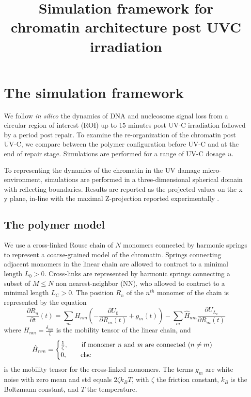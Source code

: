 \documentclass[12pt]{article}
\begin{document}
	
	\title{Simulation framework for chromatin architecture post UVC irradiation}
\maketitle
\section{The simulation framework}
	We follow \textit{in silico} the dynamics of DNA and nucleosome signal loss from a circular region of interest (ROI) up to 15 minutes post UV-C irradiation followed by a period post repair. To examine the re-organization of the chromatin post UV-C, we compare between the polymer configuration before UV-C and at the end of repair stage. Simulations are performed for a range of UV-C dosage $u$.  
	
	To representing the dynamics of the chromatin in the UV damage micro-environment, simulations are performed in a three-dimensional spherical domain with reflecting boundaries. Results are reported as the projected values on the x-y plane, in-line with the maximal Z-projection reported experimentally \cite{adam2015imaging}. 
	
	\subsection{The polymer model}
	We use a cross-linked Rouse chain of $N$ monomers connected by harmonic springs \cite{doi1988theory} to represent a coarse-grained model of the chromatin. Springs connecting adjacent monomers in the linear chain are allowed to contract to a minimal length $L_0>0$. Cross-links are represented by harmonic springs connecting a subset of $M\leq N$ non nearest-neighbor (NN), who allowed to contract to a minimal length $L_C>0$. 
	The position $R_n$ of the $n^{th}$ monomer of the chain is  represented by the equation 
	\begin{equation}
	\frac{\partial R_n}{\partial t}(t) = \sum_m H_{nm}\left(-\frac{\partial U_0}{\partial R_m(t)}+g_m(t)\right) -\sum_m \hat{H}_{nm}\frac{\partial U_{L_c}}{\partial R_m (t)}
	\end{equation}
	where $H_{nm}=\frac{\delta_{nm}}{\zeta}$ is the mobility tensor of the linear chain, and 	
	\begin{equation}
	\hat{H}_{nm}= \begin{cases}
	\frac{1}{\zeta},\qquad 
	\text{if monomer \textit{n} and \textit{m} are connected ($n\neq m$)}\\
	0,\qquad \text{else}
	\end{cases}
	\end{equation}
	is the mobility tensor for the cross-linked monomers. 
	The terms $g_m$ are white noise with zero mean and std equals $2\zeta k_BT$, with $\zeta$ the friction constant, $k_B$ is the Boltzmann constant, and $T$ the temperature.  
	
\end{document}
